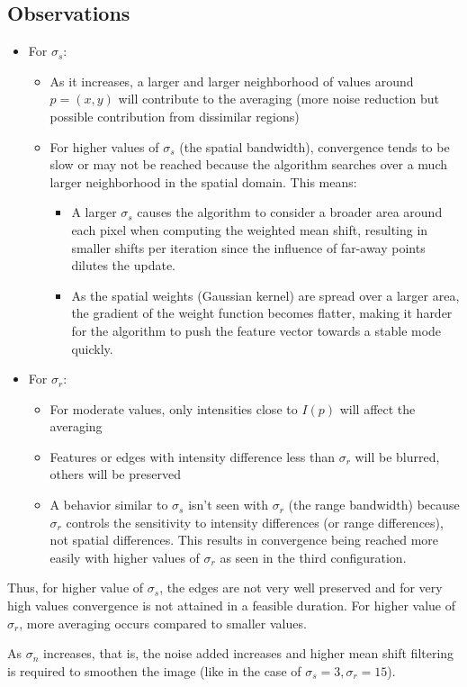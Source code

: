 \documentclass{article}
\begin{document}
\subsection{Observations}
\begin{itemize}
    \item For $\sigma_s$:
    \begin{itemize}
        \item As it increases, a larger and larger neighborhood of values around $p = (x, y)$ will contribute to the averaging (more noise reduction but possible contribution from dissimilar regions)
        \item For higher values of $\sigma_s$ (the spatial bandwidth), convergence tends to be slow or may not be reached because the algorithm searches over a much larger neighborhood in the spatial domain. This means:
        \begin{itemize}
            \item A larger $\sigma_s$ causes the algorithm to consider a broader area around each pixel when computing the weighted mean shift, resulting in smaller shifts per iteration since the influence of far-away points dilutes the update.
            \item As the spatial weights (Gaussian kernel) are spread over a larger area, the gradient of the weight function becomes flatter, making it harder for the algorithm to push the feature vector towards a stable mode quickly.
        \end{itemize}
    \end{itemize}
    \item For $\sigma_r$:
    \begin{itemize}
        \item For moderate values, only intensities close to $I(p)$ will affect the averaging
        \item Features or edges with intensity difference less than $\sigma_r$ will be blurred, others will be preserved
        \item A behavior similar to $\sigma_s$ isn't seen with $\sigma_r$ (the range bandwidth) because $\sigma_r$ controls the sensitivity to intensity differences (or range differences), not spatial differences. This results in convergence being reached more easily with higher values of $\sigma_r$ as seen in the third configuration.
    \end{itemize}
\end{itemize}

Thus, for higher value of $\sigma_s$, the edges are not very well preserved and for very high values convergence is not attained in a feasible duration. For higher value of $\sigma_r$, more averaging occurs compared to smaller values.

As $\sigma_n$ increases, that is, the noise added increases and higher mean shift filtering is required to smoothen the image (like in the case of $\sigma_s = 3, \sigma_r = 15$).
\end{document}
